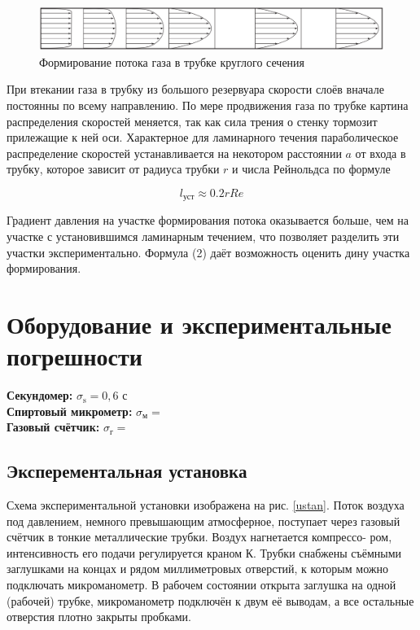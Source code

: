 \documentclass[a4paper,12pt]{article}
\begin{document}
\begin{figure}
    \includegraphics[width=1\linewidth]{potok.png}
    \centering
    \caption{Формирование потока газа в трубке круглого сечения}
    \label{potok}
\end{figure}

При втекании газа в трубку из большого резервуара скорости слоёв вначале постоянны по всему направлению. По мере продвижения газа по трубке картина распределения скоростей меняется, так как сила трения о стенку тормозит прилежащие к ней оси. Характерное для ламинарного течения параболическое распределение скоростей устанавливается на некотором расстоянии $a$ от входа в трубку, которое зависит от радиуса трубки $r$ и числа Рейнольдса по формуле 

\begin{equation}
    l_\text{уст} \approx 0.2rRe
\end{equation}

Градиент давления на участке формирования потока оказывается больше, чем на участке с установившимся ламинарным течением, что позволяет разделить эти участки экспериментально. Формула (2) даёт возможность оценить дину участка формирования.

\section{Оборудование и экспериментальные погрешности}

\textbf{Секундомер:} $\sigma_\text{s} = 0,6$ с \\
\textbf{Спиртовый микрометр:} $\sigma_\text{м} = $  \\
\textbf{Газовый счётчик:} $\sigma_\text{г} = $ 

\subsection*{Эксперементальная установка}

Схема экспериментальной установки изображена на рис. \ref{ustan}. Поток воздуха под давлением, немного превышающим атмосферное, поступает через газовый счётчик в тонкие металлические трубки. Воздух нагнетается компрессо-
ром, интенсивность его подачи регулируется краном К. Трубки снабжены съёмными заглушками на концах и рядом миллиметровых отверстий, к которым можно подключать микроманометр. В рабочем состоянии открыта заглушка на одной (рабочей) трубке, микроманометр подключён к двум её выводам, а все остальные отверстия плотно закрыты пробками.
\end{document}
